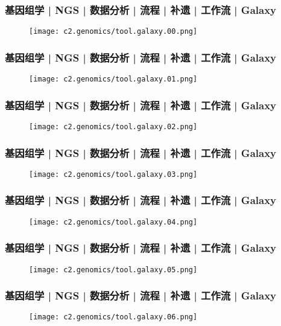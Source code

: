 \begin{frame}
  \frametitle{基因组学 | NGS | 数据分析 | 流程 | 补遗 | 工作流 | Galaxy}
  \begin{figure}
    \centering
    \texttt{[image: c2.genomics/tool.galaxy.00.png]}
  \end{figure}
\end{frame}

\begin{frame}
  \frametitle{基因组学 | NGS | 数据分析 | 流程 | 补遗 | 工作流 | Galaxy}
  \begin{figure}
    \centering
    \texttt{[image: c2.genomics/tool.galaxy.01.png]}
  \end{figure}
\end{frame}

\begin{frame}
  \frametitle{基因组学 | NGS | 数据分析 | 流程 | 补遗 | 工作流 | Galaxy}
  \begin{figure}
    \centering
    \texttt{[image: c2.genomics/tool.galaxy.02.png]}
  \end{figure}
\end{frame}

\begin{frame}
  \frametitle{基因组学 | NGS | 数据分析 | 流程 | 补遗 | 工作流 | Galaxy}
  \begin{figure}
    \centering
    \texttt{[image: c2.genomics/tool.galaxy.03.png]}
  \end{figure}
\end{frame}

\begin{frame}
  \frametitle{基因组学 | NGS | 数据分析 | 流程 | 补遗 | 工作流 | Galaxy}
  \begin{figure}
    \centering
    \texttt{[image: c2.genomics/tool.galaxy.04.png]}
  \end{figure}
\end{frame}

\begin{frame}
  \frametitle{基因组学 | NGS | 数据分析 | 流程 | 补遗 | 工作流 | Galaxy}
  \begin{figure}
    \centering
    \texttt{[image: c2.genomics/tool.galaxy.05.png]}
  \end{figure}
\end{frame}

\begin{frame}
  \frametitle{基因组学 | NGS | 数据分析 | 流程 | 补遗 | 工作流 | Galaxy}
  \begin{figure}
    \centering
    \texttt{[image: c2.genomics/tool.galaxy.06.png]}
  \end{figure}
\end{frame}

